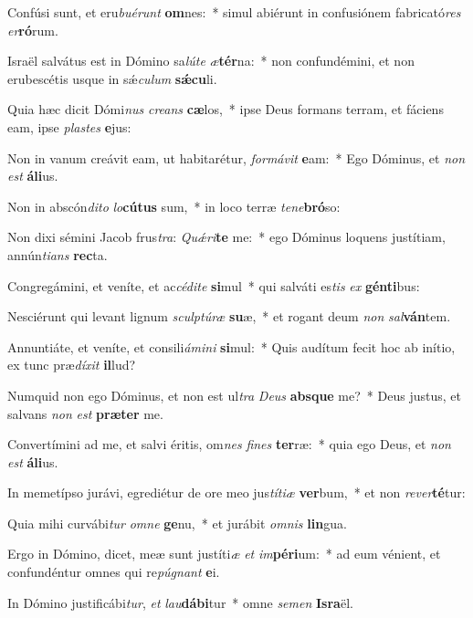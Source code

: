 \item Confúsi sunt, et eru\textit{bu}\textit{é}\textit{runt} \textbf{om}nes:~* simul abiérunt in confusiónem fabricató\textit{res} \textit{er}\textbf{ró}rum.
\item Israël salvátus est in Dómino sa\textit{lú}\textit{te} \textit{æ}\textbf{tér}na:~* non confundémini, et non erubescétis usque in sǽ\textit{cu}\textit{lum} \textbf{sǽ}\textbf{cu}li.
\item Quia hæc dicit Dómi\textit{nus} \textit{cre}\textit{ans} \textbf{cæ}los,~* ipse Deus formans terram, et fáciens eam, ipse \textit{plas}\textit{tes} \textbf{e}jus:
\item Non in vanum creávit eam, ut habitarétur, \textit{for}\textit{má}\textit{vit} \textbf{e}am:~* Ego Dóminus, et \textit{non} \textit{est} \textbf{á}\textbf{li}us.
\item Non in abscón\textit{di}\textit{to} \textit{lo}\textbf{cú}\textbf{tus} sum,~* in loco terræ \textit{te}\textit{ne}\textbf{bró}so:
\item Non dixi sémini Jacob frus\textit{tra}: \textit{Quǽ}\textit{ri}\textbf{te} me:~* ego Dóminus loquens justítiam, annún\textit{ti}\textit{ans} \textbf{rec}ta.
\item Congregámini, et veníte, et ac\textit{cé}\textit{di}\textit{te} \textbf{si}mul~* qui salváti es\textit{tis} \textit{ex} \textbf{gén}\textbf{ti}bus:
\item Nesciérunt qui levant lignum \textit{sculp}\textit{tú}\textit{ræ} \textbf{su}æ,~* et rogant deum \textit{non} \textit{sal}\textbf{ván}tem.
\item Annuntiáte, et veníte, et consili\textit{á}\textit{mi}\textit{ni} \textbf{si}mul:~* Quis audítum fecit hoc ab inítio, ex tunc præ\textit{dí}\textit{xit} \textbf{il}lud?
\item Numquid non ego Dóminus, et non est ul\textit{tra} \textit{De}\textit{us} \textbf{abs}\textbf{que} me?~* Deus justus, et salvans \textit{non} \textit{est} \textbf{præ}\textbf{ter} me.
\item Convertímini ad me, et salvi éritis, om\textit{nes} \textit{fi}\textit{nes} \textbf{ter}ræ:~* quia ego Deus, et \textit{non} \textit{est} \textbf{á}\textbf{li}us.
\item In memetípso jurávi, egrediétur de ore meo jus\textit{tí}\textit{ti}\textit{æ} \textbf{ver}bum,~* et non \textit{re}\textit{ver}\textbf{té}tur:
\item Quia mihi curvábi\textit{tur} \textit{om}\textit{ne} \textbf{ge}nu,~* et jurábit \textit{om}\textit{nis} \textbf{lin}gua.
\item Ergo in Dómino, dicet, meæ sunt justíti\textit{æ} \textit{et} \textit{im}\textbf{pé}\textbf{ri}um:~* ad eum vénient, et confundéntur omnes qui re\textit{pú}\textit{gnant} \textbf{e}i.
\item In Dómino justificábi\textit{tur}, \textit{et} \textit{lau}\textbf{dá}\textbf{bi}tur~* omne \textit{se}\textit{men} \textbf{Is}\textbf{ra}ël.
